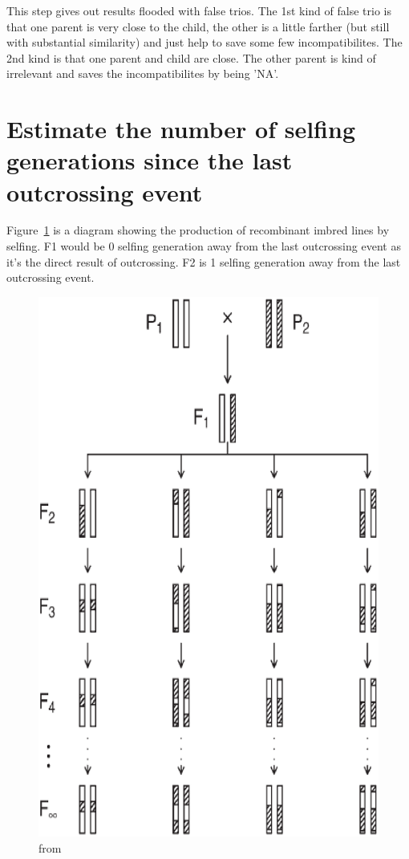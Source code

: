 \documentclass[a4paper,10pt]{article}
\begin{document}
This step gives out results flooded with false trios. The 1st kind of false trio is that one parent is very close to the child, the other is a little farther (but still with substantial similarity) and just help to save some few incompatibilites. The 2nd kind is that one parent and child are close. The other parent is kind of irrelevant and saves the incompatibilites by being 'NA'.

\section{Estimate the number of selfing generations since the last outcrossing event}
Figure~\ref{f6} is a diagram showing the production of recombinant imbred lines by selfing. F1 would be 0 selfing generation away from the last outcrossing event as it's the direct result of outcrossing. F2 is 1 selfing generation away from the last outcrossing event.

\begin{figure}
\includegraphics[width=1\textwidth]{figures/selfing_diagram.eps}
\caption{from \cite{Broman2005}}\label{f6}
\end{figure}
\end{document}

